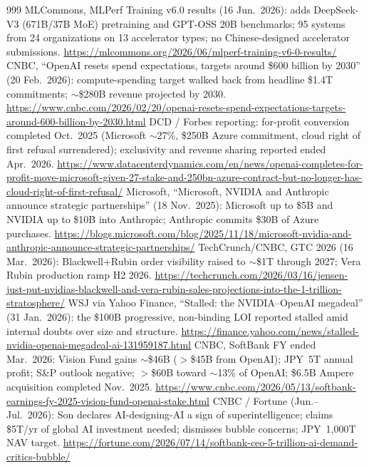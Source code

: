\begin{thebibliography}{999}
 MLCommons, MLPerf Training v6.0 results (16 Jun.\ 2026): adds DeepSeek-V3 (671B/37B MoE) pretraining and GPT-OSS 20B benchmarks; 95 systems from 24 organizations on 13 accelerator types; no Chinese-designed accelerator submissions. \url{https://mlcommons.org/2026/06/mlperf-training-v6-0-results/}
 CNBC, ``OpenAI resets spend expectations, targets around \$600 billion by 2030'' (20 Feb.\ 2026): compute-spending target walked back from headline \$1.4T commitments; $\sim$\$280B revenue projected by 2030. \url{https://www.cnbc.com/2026/02/20/openai-resets-spend-expectations-targets-around-600-billion-by-2030.html}
 DCD / Forbes reporting: for-profit conversion completed Oct.\ 2025 (Microsoft $\sim$27\%, \$250B Azure commitment, cloud right of first refusal surrendered); exclusivity and revenue sharing reported ended Apr.\ 2026. \url{https://www.datacenterdynamics.com/en/news/openai-completes-for-profit-move-microsoft-given-27-stake-and-250bn-azure-contract-but-no-longer-has-cloud-right-of-first-refusal/}
 Microsoft, ``Microsoft, NVIDIA and Anthropic announce strategic partnerships'' (18 Nov.\ 2025): Microsoft up to \$5B and NVIDIA up to \$10B into Anthropic; Anthropic commits \$30B of Azure purchases. \url{https://blogs.microsoft.com/blog/2025/11/18/microsoft-nvidia-and-anthropic-announce-strategic-partnerships/}
 TechCrunch/CNBC, GTC 2026 (16 Mar.\ 2026): Blackwell+Rubin order visibility raised to $\sim$\$1T through 2027; Vera Rubin production ramp H2 2026. \url{https://techcrunch.com/2026/03/16/jensen-just-put-nvidias-blackwell-and-vera-rubin-sales-projections-into-the-1-trillion-stratosphere/}
 WSJ via Yahoo Finance, ``Stalled: the NVIDIA--OpenAI megadeal'' (31 Jan.\ 2026): the \$100B progressive, non-binding LOI reported stalled amid internal doubts over size and structure. \url{https://finance.yahoo.com/news/stalled-nvidia-openai-megadeal-ai-131959187.html}
 CNBC, SoftBank FY ended Mar.\ 2026: Vision Fund gains $\sim$\$46B ($>$\$45B from OpenAI); JPY~5T annual profit; S\&P outlook negative; $>$\$60B toward $\sim$13\% of OpenAI; \$6.5B Ampere acquisition completed Nov.\ 2025. \url{https://www.cnbc.com/2026/05/13/softbank-earnings-fy-2025-vision-fund-openai-stake.html}
 CNBC / Fortune (Jun.--Jul.\ 2026): Son declares AI-designing-AI a sign of superintelligence; claims \$5T/yr of global AI investment needed; dismisses bubble concerns; JPY~1,000T NAV target. \url{https://fortune.com/2026/07/14/softbank-ceo-5-trillion-ai-demand-critics-bubble/}

\end{thebibliography}
